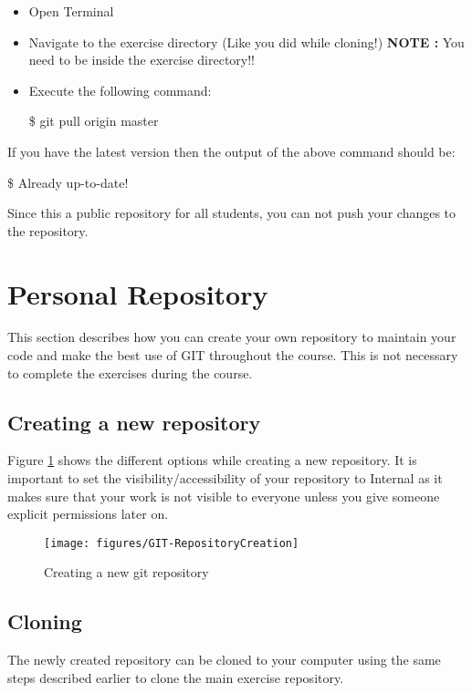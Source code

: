 \documentclass{cmc}
\begin{document}
\begin{itemize}
\item Open Terminal
\item Navigate to the exercise directory (Like you did while cloning!)
  \textbf{NOTE : } You need to be inside the exercise directory!!
\item Execute the following command:
  \begin{center}
    \$ git pull origin master
  \end{center}
\end{itemize}

If you have the latest version then the output of the above command
should be:

\begin{center}
  \$ Already up-to-date!
\end{center}

Since this a public repository for all students, you can not push your
changes to the repository.

\newpage
\section{Personal Repository}
\label{sec:creat-new-repos}

This section describes how you can create your own repository to
maintain your code and make the best use of GIT throughout the
course. This is not necessary to complete the exercises during the
course.

\subsection{Creating a new repository}
\label{sec:creat-new-repos-1}

Figure \ref{fig:git-create-repo} shows the different options while
creating a new repository.  It is important to set the
visibility/accessibility of your repository to Internal as it makes
sure that your work is not visible to everyone unless you give someone
explicit permissions later on.

\begin{figure}[H]
  \centering
  \texttt{[image: figures/GIT-RepositoryCreation]}
  \caption{Creating a new git repository}
  \label{fig:git-create-repo}
\end{figure}

\subsection{Cloning}
\label{sec:personal-cloning}
The newly created repository can be cloned to your computer using the
same steps described earlier to clone the main exercise repository.
\end{document}
